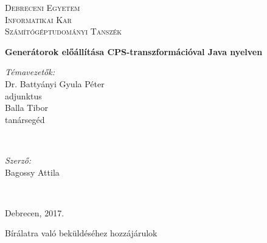 %
%
%

\begin{titlepage}

\center

\textsc{\LARGE Debreceni Egyetem}\\[1.5cm]
\textsc{\Large Informatikai Kar}
\\[0.5cm]

\textsc{\large Számítógéptudományi Tanszék}
\\[2.5cm]

{\huge \bfseries Generátorok előállítása CPS-transzformációval Java nyelven \par}

\if{}
  \vspace*{7.5cm}

  \begin{minipage}[t]{0.4\textwidth}
    \begin{flushleft} 
      \large \textit{Témavezetők:} \\
      Dr. Battyányi Gyula Péter  \\
      adjunktus \\
      Balla Tibor \\
      tanársegéd 
      \par
    \end{flushleft}
  \end{minipage}
  ~
  \begin{minipage}[t]{0.4\textwidth}
    \begin{flushright}
      \large \textit{Szerző:}\\
      Bagossy Attila 
      \par
    \end{flushright}
  \end{minipage}
  \\[2.5cm]
\else
  \vspace*{11.5cm}
\fi

{\large Debrecen, 2017.}\\ 

\begin{flushleft}
	Bírálatra való beküldéséhez hozzájárulok
\end{flushleft}

\vfill

\end{titlepage}